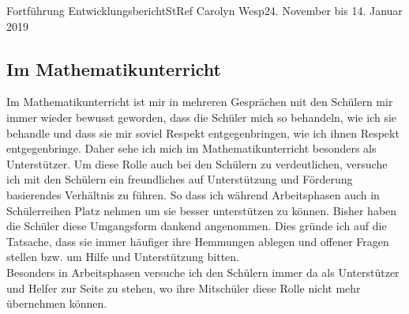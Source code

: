 \documentclass[oneside,openany,headings=optiontotoc,11pt,numbers=noenddot]{article}
\begin{document}
\begin{worksheet}{Fortführung Entwicklungsbericht}{StRef\grq{} Carolyn Wesp}{24. November bis 14. Januar 2019}
		\subsection*{Im Mathematikunterricht}
		Im Mathematikunterricht ist mir in mehreren Gesprächen mit den Schülern mir immer wieder bewusst geworden, dass die Schüler mich so behandeln, wie ich sie behandle und dass sie mir soviel Respekt entgegenbringen, wie ich ihnen Respekt entgegenbringe. Daher sehe ich mich im Mathematikunterricht besonders als Unterstützer. Um diese Rolle auch bei den Schülern zu verdeutlichen, versuche ich mit den Schülern ein freundliches auf Unterstützung und Förderung basierendes Verhältnis zu führen. So dass ich während Arbeitsphasen auch in Schülerreihen Platz nehmen um sie besser unterstützen zu können. Bisher haben die Schüler diese Umgangsform dankend angenommen. Dies gründe ich auf die Tatsache, dass sie immer häufiger ihre Hemmungen ablegen und offener Fragen stellen bzw. um Hilfe und Unterstützung bitten.\\
		Besonders in Arbeitsphasen versuche ich den Schülern immer da als Unterstützer und Helfer zur Seite zu stehen, wo ihre Mitschüler diese Rolle nicht mehr übernehmen können.\\

\end{worksheet}
\end{document}
